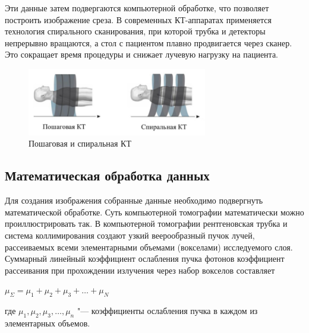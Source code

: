 Эти данные затем подвергаются компьютерной обработке, что позволяет построить изображение среза. В современных КТ-аппаратах применяется технология спирального сканирования, при которой трубка и детекторы непрерывно вращаются, а стол с пациентом плавно продвигается через сканер. Это сокращает время процедуры и снижает лучевую нагрузку на пациента\cite{ktmrt}.
\begin{figure}[H]
    \centering
    \includegraphics[width=0.7\textwidth]{pic/3.png}
    \caption{Пошаговая и спиральная КТ}
    \label{fig:image1}
\end{figure}

\subsection{Математическая обработка данных}

Для создания изображения собранные данные необходимо подвергнуть математической обработке. Суть компьютерной томографии математически можно проиллюстрировать так. В компьютерной томографии рентгеновская трубка и система коллимирования создают узкий веерообразный пучок лучей, рассеиваемых всеми элементарными объемами (вокселами) исследуемого слоя. Суммарный линейный коэффициент ослабления пучка фотонов коэффициент рассеивания при прохождении излучения через набор вокселов составляет
\begin{center}
    $\mu_{\Sigma} = \mu_1 + \mu_2 + \mu_3 + \dots + \mu_N$
\end{center}
где $\mu_1, \mu_2, \mu_3,\dots, \mu_n$ "--- коэффициенты ослабления пучка в каждом из элементарных объемов.

